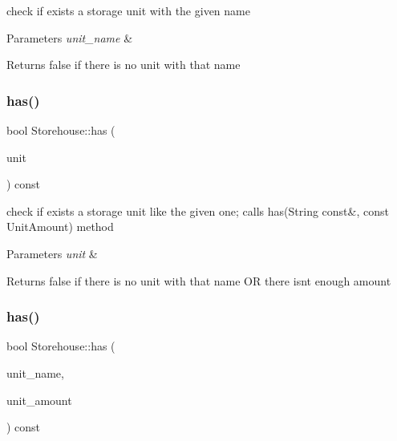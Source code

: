 check if exists a storage unit with the given name 
\begin{DoxyParams}{Parameters}
{\em unit\+\_\+name} & \\
\hline
\end{DoxyParams}
\begin{DoxyReturn}{Returns}
false if there is no unit with that name 
\end{DoxyReturn}
\mbox{\label{classStorehouse_a0b06fb6fa2819193775c2aba04e8ff5c}} 
\subsubsection{\texorpdfstring{has()}{has()}\hspace{0.1cm}{\footnotesize\ttfamily [2/3]}}
{\footnotesize\ttfamily bool Storehouse\+::has (\begin{DoxyParamCaption}\item[{const \hyperlink{classStorageUnit}{Storage\+Unit} \&}]{unit }\end{DoxyParamCaption}) const}

check if exists a storage unit like the given one; calls has(\+String const\&, const Unit\+Amount) method 
\begin{DoxyParams}{Parameters}
{\em unit} & \\
\hline
\end{DoxyParams}
\begin{DoxyReturn}{Returns}
false if there is no unit with that name OR there isn\textquotesingle{}t enough amount 
\end{DoxyReturn}
\mbox{\label{classStorehouse_a757d0c9fccad409c6f5bdd502e081e7b}} 
\subsubsection{\texorpdfstring{has()}{has()}\hspace{0.1cm}{\footnotesize\ttfamily [3/3]}}
{\footnotesize\ttfamily bool Storehouse\+::has (\begin{DoxyParamCaption}\item[{\hyperlink{classString}{String} const \&}]{unit\+\_\+name,  }\item[{const \hyperlink{StorageUnit_8hpp_a13b2ba6b0400e1aa0b57282bd1228f20}{Unit\+Amount}}]{unit\+\_\+amount }\end{DoxyParamCaption}) const}

